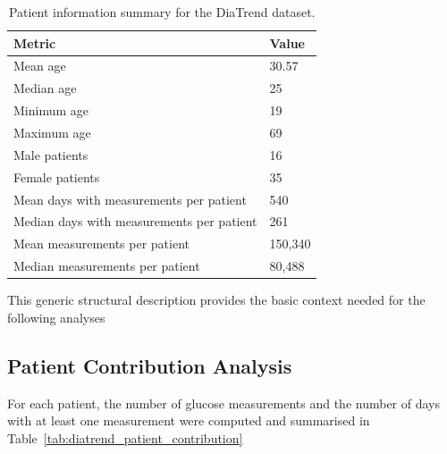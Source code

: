 \begin{table}[htbp]
    \centering
    \caption{Patient information summary for the DiaTrend dataset.}
    \label{tab:diatrend_patient_information}
    \begin{tabular}{ll}
        \hline
        \textbf{Metric} & \textbf{Value} \\
        \hline
        Mean age & 30.57 \\
        Median age & 25 \\
        Minimum age & 19 \\
        Maximum age & 69 \\
        \hline
        Male patients & 16 \\
        Female patients & 35 \\
        \hline
        Mean days with measurements per patient & 540 \\
        Median days with measurements per patient & 261 \\
        \hline
        Mean measurements per patient & 150,340\\
        Median measurements per patient & 80,488 \\
        \hline
    \end{tabular}
\end{table}

This generic structural description provides the basic context needed for the following analyses

\subsection{Patient Contribution Analysis}
\label{subsec:diatrend_patient_contribution}

For each patient, the number of glucose measurements and the number of days with at least one measurement were computed and summarised in Table~\ref{tab:diatrend_patient_contribution}

